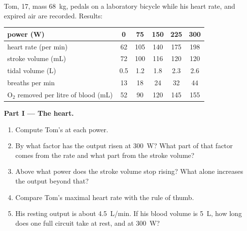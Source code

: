 \begin{problem}
\label{pb:g10:heart-lungs-effort:1}
Tom, 17, mass \qty{68}{kg}, pedals on a laboratory bicycle while his
heart rate,  and expired air are recorded. Results:

\begin{center}
\begin{tabular}{lccccc}
power (W) & 0 & 75 & 150 & 225 & 300 \\ \hline
heart rate (per min) & 62 & 105 & 140 & 175 & 198 \\
stroke volume (mL) & 72 & 100 & 116 & 120 & 120 \\
tidal volume (L) & 0.5 & 1.2 & 1.8 & 2.3 & 2.6 \\
breaths per min & 13 & 18 & 24 & 32 & 44 \\
$\mathrm{O_2}$ removed per litre of blood (mL) & 52 & 90 & 120 & 145 & 155 \\
\end{tabular}
\end{center}

\medskip
\noindent\textbf{Part I --- The heart.}
\begin{enumerate}
  \item Compute Tom's  at each power.
  \item By what factor has the output risen at \qty{300}{W}? What
        part of that factor comes from the rate and what part from the
        stroke volume?
  \item Above what power does the stroke volume stop rising? What
        alone increases the output beyond that?
  \item Compare Tom's maximal heart rate with the rule of thumb.
  \item His resting output is about \qty{4.5}{L/min}. If his blood
        volume is \qty{5}{L}, how long does one full circuit take at
        rest, and at \qty{300}{W}?
\end{enumerate}


\end{problem}
